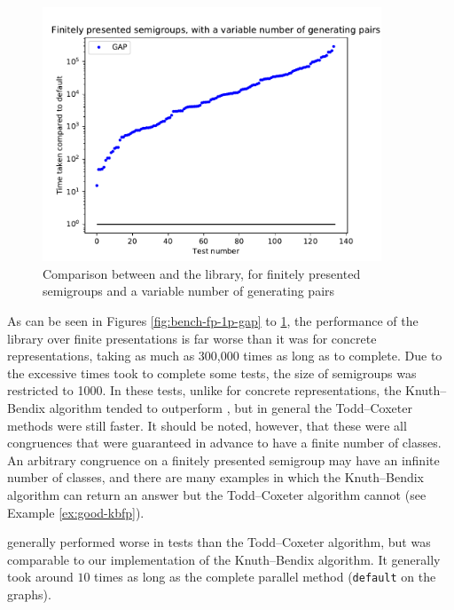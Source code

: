 \begin{figure}[p]
  \centering
  \includegraphics[width=0.9\textwidth]{pics/ch-pairs/bench-fp-vp-gap}
  \caption[Benchmark: \GAP{}/\libsemigroups{}, finitely presented, $n$ pairs]
  {Comparison between \libsemigroups{} and the \GAP{} library, for
    finitely presented semigroups and a variable number of generating pairs}
  \label{fig:bench-fp-vp-gap}
\end{figure}

As can be seen in Figures \ref{fig:bench-fp-1p-gap} to \ref{fig:bench-fp-vp-gap}, the
performance of the \GAP{} library over finite presentations is far worse
than it was for concrete representations, taking as much as 300,000 times as long
as \libsemigroups{} to complete.  Due to the excessive times \GAP{} took to
complete some tests, the size of semigroups was restricted to 1000.  In these
tests, unlike for concrete representations,
the Knuth--Bendix algorithm tended to outperform \GAP{}, but in
general the Todd--Coxeter methods were still faster.  It should be noted, however,
that these were all congruences that were guaranteed in advance to have a finite
number of classes.  An arbitrary congruence on a finitely presented semigroup
may have an infinite number of classes, and there are many examples in which
the Knuth--Bendix algorithm can return an answer but the Todd--Coxeter algorithm cannot (see Example
\ref{ex:good-kbfp}).

\kbmag{} generally performed worse in tests than the Todd--Coxeter algorithm, but was
comparable to our implementation of the Knuth--Bendix algorithm.  It generally took around
$10$ times as long as the complete parallel method (\texttt{default} on the
graphs).

